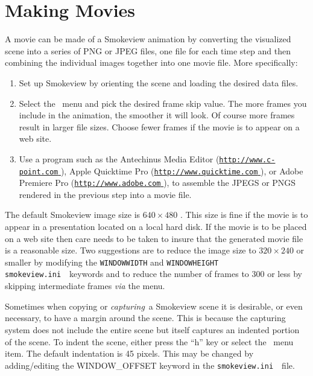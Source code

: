 \documentclass[11pt,twoside]{book}
\newcommand{\svini}{{\tt smokeview.ini}\ }
\newcommand{\hhref}[1]{\href{#1}{{\tt #1}
}}
\newcommand{\frameit}[1]{\fbox{\tt #1}}
\begin{document}
\chapter{Making Movies} \label{section:movie} A movie can be made
of a Smokeview animation by converting the visualized scene into a
series of PNG or JPEG files, one file for each time step and then
combining the individual images together into one movie file. More
specifically:

\begin{enumerate}
\item Set up Smokeview by orienting the scene and loading the
desired data files.

\item Select the \ menu and pick the
desired frame skip value. The more frames you include in
the animation, the smoother it will look. Of course more
frames result in larger file sizes.  Choose fewer frames
if the movie is to appear on a web site.

\item Use a program such as the Antechinus Media Editor
(\hhref{http://www.c-point.com}),
Apple Quicktime Pro (\hhref{http://www.quicktime.com}),
 or
Adobe Premiere Pro (\hhref{http://www.adobe.com}),
to assemble the
JPEGS or PNGS rendered in the previous step into a movie
file.
\end{enumerate}

The default Smokeview image size is $640\times 480$ .  This size
is fine if the movie is to appear in a presentation located on a
local hard disk.  If the movie is to be placed on a web site then
care needs to be taken to insure that the generated movie file is
a reasonable size.  Two suggestions are to reduce the image size
to $320\times 240$ or smaller by modifying the {\tt WINDOWWIDTH}
and {\tt WINDOWHEIGHT} \svini\ keywords  and to reduce the
number of frames to 300 or less by skipping intermediate frames
{\em via} the \frameit{Options/Render} menu.

Sometimes when copying or {\em capturing}\ a Smokeview scene it is
desirable, or even necessary, to have a margin around the scene.
This is because the capturing system does not include the entire
scene but itself captures an indented portion of the scene. To
indent the scene, either press the ``h'' key or select the
\ menu item. The
default indentation is 45 pixels. This may be changed by
adding/editing the WINDOW\_OFFSET keyword in the \svini\
file.
\end{document}
